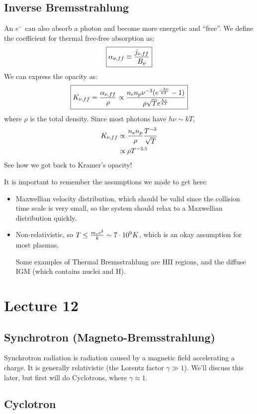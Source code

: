 \documentclass[11pt]{article}
\def\e#1{\cdot10^{#1}}
\begin{document}
\subsection*{ Inverse Bremsstrahlung}

An $e^-$ can also absorb a photon and become more energetic and ``free''.  We 
define the coefficient for thermal free-free absorption as:
\def\anff{\alpha_{\nu,ff}}
$$\boxed{\anff\equiv{\jnff\over B_\nu}}$$
We can express the opacity as:
\def\knff{K_{\nu,ff}}
$$\boxed{\knff={\anff\over\rho}\propto{n_en_p\nu^{-3}(e^{-h\nu\over kT}-1)\over
\rho\sqrt{T}e^{h\nu\over kT}}}$$
where $\rho$ is the total density.  Since most photons have $h\nu\sim kT$,
$$\begin{aligned}\knff&\propto{n_en_p\over\rho}{T^{-3}\over\sqrt{T}}\\ 
&\propto\rho T^{-3.5}\\ \end{aligned}$$
See how we got back to Kramer's opacity!\par
It is important to remember the assumptions we made to get here:
\begin{itemize}
\item Maxwellian velocity distribution, which should be valid since the
collision time scale is very small, so the system should relax to a 
Maxwellian distribution quickly.
\item Non-relativistic, so $T\le{m_ec^2\over k}\sim7\e9K$, which
is an okay assumption for most plasmas.\par
Some examples of Thermal Bremsstrahlung are HII regions, and the diffuse
IGM (which contains nuclei and H).
\end{itemize}

\section*{ Lecture 12 }

\subsection*{ Synchrotron (Magneto-Bremsstrahlung)}

Synchrotron radiation is radiation caused by a magnetic field accelerating
a charge.  It is generally relativistic (the Lorentz factor $\gamma\gg1$).
We'll discuss this later, but first will do Cyclotrons, where $\gamma\approx1$.

\subsection*{ Cyclotron}
\end{document}
